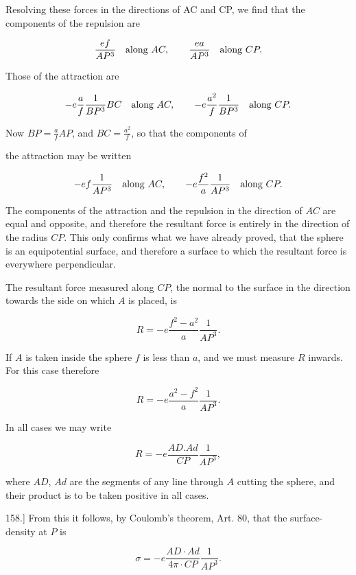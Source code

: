 \documentclass[11pt,a4paper]{article}
\begin{document}
Resolving these forces in the directions of AC and CP, we find that the components of the repulsion are

\[
\frac{ef}{AP^3}\quad\hbox{along }AC,\qquad
\frac{ea}{AP^3}\quad\hbox{along }CP.
\]

Those of the attraction are

\[
-e\frac{a}{f}\frac{1}{BP^3}BC\quad\hbox{along }AC,\qquad
-e\frac{a^2}{f}\frac{1}{BP^3}\quad\hbox{along }CP.
\]

Now $BP=\frac{a}{f}AP$, and $BC=\frac{a^2}{f}$, so that the components of

the attraction may be written

\[
-ef\frac{1}{AP^3}\quad\hbox{along }AC,\qquad
-e\frac{f^2}{a}\frac{1}{AP^3}\quad\hbox{along }CP.
\]

The components of the attraction and the repulsion in the direction of $AC$ are equal and opposite, and therefore the resultant force is entirely in the direction of the radius $CP$. This only confirms what we have already proved, that the sphere is an equipotential surface, and therefore a surface to which the resultant force is everywhere perpendicular.

The resultant force measured along $CP$, the normal to the surface in the direction towards the side on which $A$ is placed, is

\begin{equation}\tag{3}
R=-e\frac{f^2-a^2}{a}\frac{1}{AP^3}.
\end{equation}

If $A$ is taken inside the sphere $f$ is less than $a$, and we must measure $R$ inwards. For this case therefore

\begin{equation}\tag{4}
R=-e\frac{a^2-f^2}{a}\frac{1}{AP^3}.
\end{equation}

In all cases we may write

\begin{equation}\tag{5}
R = -e\frac{AD.Ad}{CP} \frac{1}{AP^3},
\end{equation}

where $AD$, $Ad$ are the segments of any line through $A$ cutting the sphere, and their product is to be taken positive in all cases.

158.] From this it follows, by Coulomb's theorem, Art. 80, that the surface-density at $P$ is

\begin{equation}\tag{6}
\sigma = -e \frac{AD \cdot Ad}{4\pi \cdot CP} \frac{1}{AP^3}.
\end{equation}
\end{document}
